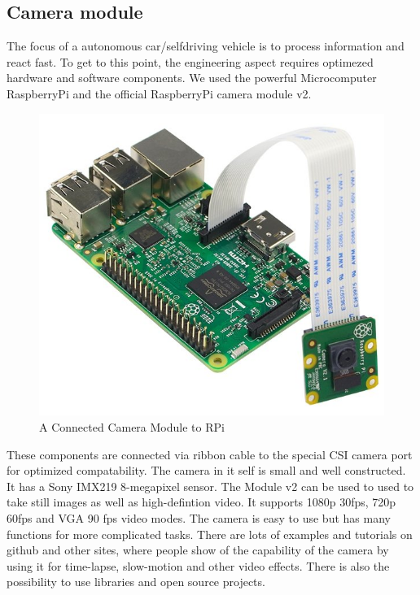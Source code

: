 \documentclass[conference]{IEEEtran}
\begin{document}
\subsection{Camera module}
The focus of a autonomous car/selfdriving vehicle is to process information and react fast. To get to this point, the engineering aspect requires optimezed hardware and software components. We used the powerful Microcomputer RaspberryPi and the official RaspberryPi camera module v2. 
\begin{figure}[h!]
	\includegraphics[width=\linewidth]{CameraModule.png}
	\caption{A Connected Camera Module to RPi}
	\label{fig:CMRPi}
\end{figure}
These components are connected via ribbon cable to the special CSI camera port for optimized compatability. The camera in it self is small and well constructed. It has a Sony IMX219 8-megapixel sensor. The Module v2 can be used to used to take still images as well as high-defintion video. It supports  1080p 30fps, 720p 60fps and VGA 90 fps video modes. The camera is easy to use but has many functions for more complicated tasks. There are lots of examples and tutorials on github and other sites, where people show of the capability of the camera by using it for time-lapse, slow-motion and other video effects. There is also the possibility to use libraries and open source projects. 
\newline
\end{document}
